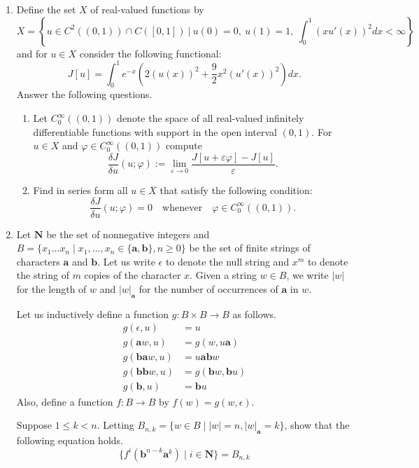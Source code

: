 \documentclass[10pt,a4paper]{article}
\begin{document}
\begin{enumerate}[label=\fbox{\arabic*}]
  \item %
        Define the set $X$ of real-valued functions by
        \[
          X = \left\{ u \in C^2((0, 1)) \cap C([0, 1]) \ \Big| \ u(0) = 0, \ u(1) = 1, \ \int_0^1 (x u'(x))^2 dx < \infty \right\}
        \]
        and for $u \in X$ consider the following functional:
        \[
          J[u] = \int_0^1 e^{-x} \left( 2(u(x))^2 + \frac{9}{2}x^2 (u'(x))^2 \right) dx.
        \]
        Answer the following questions.
        \begin{enumerate}[label=(\arabic*)]
          \item Let $C_0^\infty((0, 1))$ denote the space of all real-valued infinitely differentiable functions with support in the open interval $(0, 1)$. For $u \in X$ and $\varphi \in C_0^\infty((0, 1))$ compute
          \[
            \frac{\delta J}{\delta u}(u; \varphi) := \lim_{\varepsilon \to 0} \frac{J[u + \varepsilon \varphi] - J[u]}{\varepsilon}.
          \]
          \item Find in series form all $u \in X$ that satisfy the following condition:
          \[
            \frac{\delta J}{\delta u}(u; \varphi) = 0 \quad \text{whenever} \quad \varphi \in C_0^\infty((0, 1)).
          \]
        \end{enumerate}

  \item %
        Let $\mathbf{N}$ be the set of nonnegative integers and $B = \{ x_1 \dots x_n \mid x_1, \dots, x_n \in \{\mathbf{a}, \mathbf{b}\}, n \ge 0 \}$ be the set of finite strings of characters $\mathbf{a}$ and $\mathbf{b}$. Let us write $\epsilon$ to denote the null string and $x^m$ to denote the string of $m$ copies of the character $x$. Given a string $w \in B$, we write $|w|$ for the length of $w$ and $|w|_\mathbf{a}$ for the number of occurrences of $\mathbf{a}$ in $w$.

        Let us inductively define a function $g : B \times B \to B$ as follows.
        \begin{align*}
          g(\epsilon, u) &= u \\
          g(\mathbf{a}w, u) &= g(w, u\mathbf{a}) \\
          g(\mathbf{b}\mathbf{a}w, u) &= u\mathbf{a}\mathbf{b}w \\
          g(\mathbf{b}\mathbf{b}w, u) &= g(\mathbf{b}w, \mathbf{b}u) \\
          g(\mathbf{b}, u) &= \mathbf{b}u
        \end{align*}
        Also, define a function $f : B \to B$ by $f(w) = g(w, \epsilon)$.

        Suppose $1 \le k < n$. Letting $B_{n,k} = \{ w \in B \mid |w| = n, |w|_\mathbf{a} = k \}$, show that the following equation holds.
        \[
          \{ f^i(\mathbf{b}^{n-k}\mathbf{a}^k) \mid i \in \mathbf{N} \} = B_{n,k}
        \]
\end{enumerate}
\end{document}
